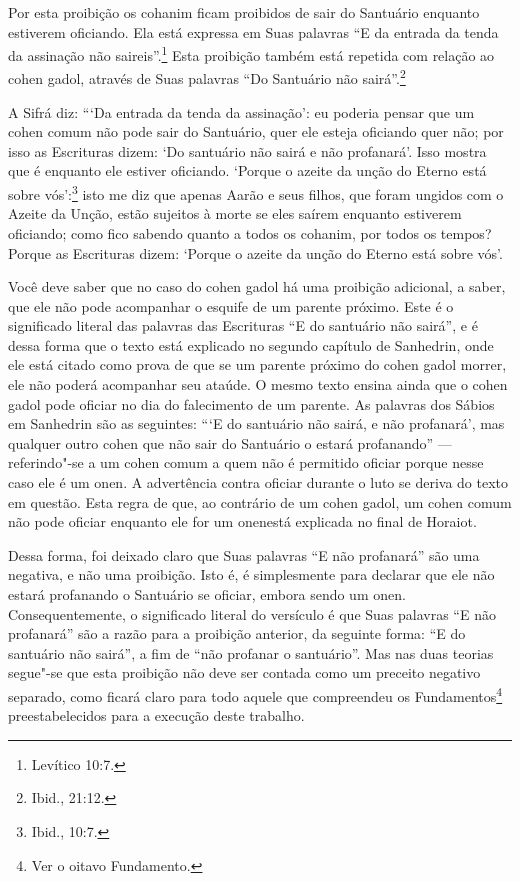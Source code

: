 \begin{multicols}{2}
Por esta proibição os cohanim\starr{} ficam proibidos de sair do Santuário
enquanto estiverem oficiando. Ela está expressa em Suas palavras ``E da
entrada da tenda da assinação não saireis''.\footnote{Levítico 10:7.} Esta
proibição também está repetida com relação ao cohen gadol\starr, através
de Suas palavras ``Do Santuário não sairá''.\footnote{Ibid., 21:12.}

A Sifrá\starr{} diz: ```Da entrada da tenda da assinação': eu poderia pensar que
um cohen\starr{} comum não pode sair do Santuário, quer ele esteja oficiando
quer não; por isso as Escrituras dizem: `Do santuário não sairá e não
profanará'. Isso mostra que é enquanto ele estiver oficiando. `Porque o
azeite da unção do Eterno está sobre vós':\footnote{Ibid., 10:7.} isto me diz que
apenas Aarão e seus filhos, que foram ungidos com o Azeite da Unção,
estão sujeitos à morte se eles saírem enquanto estiverem oficiando; como
fico sabendo quanto a todos os cohanim\starr, por todos os tempos? Porque as
Escrituras dizem: `Porque o azeite da unção do Eterno está sobre
vós'.

Você deve saber que no caso do cohen gadol\starr{} há uma proibição
adicional, a saber, que ele não pode acompanhar o esquife de um parente
próximo. Este é o significado literal das palavras das Escrituras ``E do
santuário não sairá'', e é dessa forma que o texto está explicado no
segundo capítulo de Sanhedrin\starr, onde ele está citado como prova de que
se um parente próximo do cohen gadol\starr{} morrer, ele não poderá
acompanhar seu ataúde. O mesmo texto ensina ainda que o cohen gadol\starr{}
pode oficiar no dia do falecimento de um parente. As palavras dos Sábios
em Sanhedrin\starr{} são as seguintes: ```E do santuário não sairá, e não
profanará', mas qualquer outro cohen\starr{} que não sair do Santuário o
estará profanando'' --- referindo"-se a um cohen\starr{} comum a quem não é
permitido oficiar porque nesse caso ele é um onen\starr. A advertência
contra oficiar durante o luto se deriva do texto em questão. Esta regra
de que, ao contrário de um cohen gadol\starr, um cohen\starr{} comum não pode
oficiar enquanto ele for um onen\starr está explicada no final de
Horaiot\starr.

Dessa forma, foi deixado claro que Suas palavras ``E não profanará''
são uma negativa, e não uma proibição. Isto é, é simplesmente para
declarar que ele não estará profanando o Santuário se oficiar, embora sendo um
onen\starr.
Consequentemente, o significado literal do versículo é que Suas palavras
``E não profanará'' são a razão para a proibição anterior, da seguinte
forma: ``E do santuário não sairá'', a fim de ``não profanar o santuário''.
Mas nas duas teorias segue"-se que esta proibição não deve ser contada
como um preceito negativo separado, como ficará claro para todo aquele
que compreendeu os Fundamentos\footnote{Ver o oitavo Fundamento.} preestabelecidos
para a execução deste trabalho.


\end{multicols}
